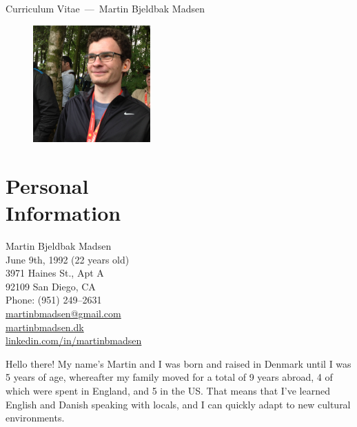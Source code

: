 \documentclass[margin,line]{resume}
\begin{document}
\raggedright%
{\sc \Large Curriculum Vitae~---~Martin Bjeldbak Madsen}
\begin{resume}
    \vspace{0.5cm}
    \begin{figure}
         \vspace{-1cm}
        \begin{center}
        \includegraphics[width=0.4\textwidth]{moi.jpg}
        \end{center}
         \vspace{-3.5cm}
    \end{figure}

    \section{\mysidestyle{} Personal\\Information}%
    Martin Bjeldbak Madsen\\
    June 9th, 1992 (22 years old)\\ 
    3971 Haines St., Apt A\\
    92109 San Diego, CA \\
    Phone: (951) 249--2631\\
    \href{mailto:martinbmadsen@gmail.com}{martinbmadsen@gmail.com}\\
    \href{http://martinbmadsen.dk}{martinbmadsen.dk}\\
    \href{http://dk.linkedin.com/in/martinbmadsen/}{linkedin.com/in/martinbmadsen}
    \vspace{1.25cm}

    Hello there! My name's Martin and I was born and raised in Denmark
    until I was 5 years of age, whereafter my family moved for a total
    of 9 years abroad, 4 of which were spent in England, and 5 in the
    US\@. That means that I've learned English and Danish speaking with
    locals, and I can quickly adapt to new cultural environments.


\end{resume}
\end{document}
